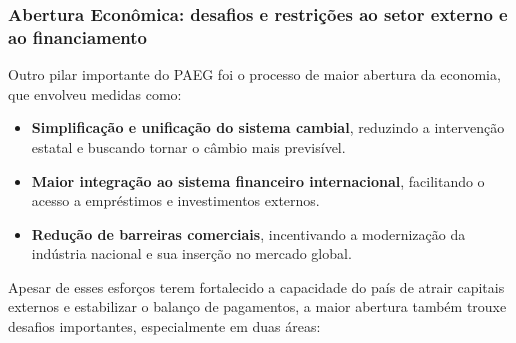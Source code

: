 \documentclass[a4paper,12pt]{article}[abntex2]
\begin{document}
\subsubsection{Abertura Econômica: desafios e restrições ao setor externo e ao financiamento}
Outro pilar importante do PAEG foi o processo de maior abertura da economia, que envolveu medidas como:

\begin{itemize}
    \item \textbf{Simplificação e unificação do sistema cambial}, reduzindo a intervenção estatal e buscando tornar o câmbio mais previsível.
    \item \textbf{Maior integração ao sistema financeiro internacional}, facilitando o acesso a empréstimos e investimentos externos.
    \item \textbf{Redução de barreiras comerciais}, incentivando a modernização da indústria nacional e sua inserção no mercado global.
\end{itemize}

Apesar de esses esforços terem fortalecido a capacidade do país de atrair capitais externos e estabilizar o balanço de pagamentos, a maior abertura também trouxe desafios importantes, especialmente em duas áreas:
\end{document}
